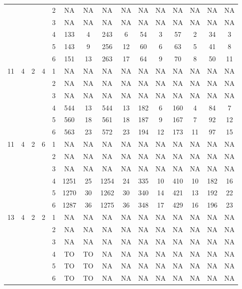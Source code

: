 \begin{longtable}{|c|c|c|c|c|c c|c c|c c|c c|c c|}
 & & & & 2 & NA & NA & NA & NA & NA & NA & NA & NA & NA & NA \\
 & & & & 3 & NA & NA & NA & NA & NA & NA & NA & NA & NA & NA \\
 & & & & 4 & 133 & 4 & 243 & 6 & 54 & 3 & 57 & 2 & 34 & 3 \\
 & & & & 5 & 143 & 9 & 256 & 12 & 60 & 6 & 63 & 5 & 41 & 8 \\
 & & & & 6 & 151 & 13 & 263 & 17 & 64 & 9 & 70 & 8 & 50 & 11 \\
\hline
\multirow{6}{*}{11} & \multirow{6}{*}{4} & \multirow{6}{*}{2} & \multirow{6}{*}{4} & 1 & NA & NA & NA & NA & NA & NA & NA & NA & NA & NA \\
 & & & & 2 & NA & NA & NA & NA & NA & NA & NA & NA & NA & NA \\
 & & & & 3 & NA & NA & NA & NA & NA & NA & NA & NA & NA & NA \\
 & & & & 4 & 544 & 13 & 544 & 13 & 182 & 6 & 160 & 4 & 84 & 7 \\
 & & & & 5 & 560 & 18 & 561 & 18 & 187 & 9 & 167 & 7 & 92 & 12 \\
 & & & & 6 & 563 & 23 & 572 & 23 & 194 & 12 & 173 & 11 & 97 & 15 \\
\hline
\multirow{6}{*}{11} & \multirow{6}{*}{4} & \multirow{6}{*}{2} & \multirow{6}{*}{6} & 1 & NA & NA & NA & NA & NA & NA & NA & NA & NA & NA \\
 & & & & 2 & NA & NA & NA & NA & NA & NA & NA & NA & NA & NA \\
 & & & & 3 & NA & NA & NA & NA & NA & NA & NA & NA & NA & NA \\
 & & & & 4 & 1251 & 25 & 1254 & 24 & 335 & 10 & 410 & 10 & 182 & 16 \\
 & & & & 5 & 1270 & 30 & 1262 & 30 & 340 & 14 & 421 & 13 & 192 & 22 \\
 & & & & 6 & 1287 & 36 & 1275 & 36 & 348 & 17 & 429 & 16 & 196 & 23 \\
\hline
\multirow{6}{*}{13} & \multirow{6}{*}{4} & \multirow{6}{*}{2} & \multirow{6}{*}{2} & 1 & NA & NA & NA & NA & NA & NA & NA & NA & NA & NA \\
 & & & & 2 & NA & NA & NA & NA & NA & NA & NA & NA & NA & NA \\
 & & & & 3 & NA & NA & NA & NA & NA & NA & NA & NA & NA & NA \\
 & & & & 4 & TO & TO & NA & NA & NA & NA & NA & NA & NA & NA \\
 & & & & 5 & TO & TO & NA & NA & NA & NA & NA & NA & NA & NA \\
 & & & & 6 & TO & TO & NA & NA & NA & NA & NA & NA & NA & NA \\

\end{longtable}
